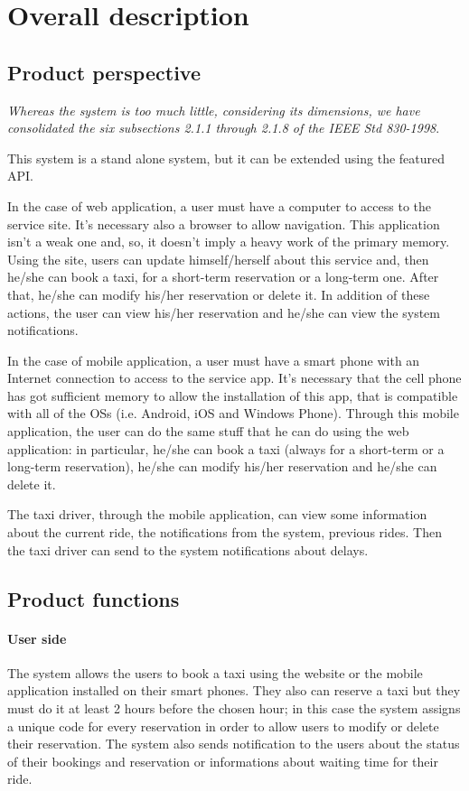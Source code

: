 \section{Overall description}
	\subsection{Product perspective}
		\emph{Whereas the system is too much little, considering its dimensions, we have consolidated the six subsections 2.1.1 through 2.1.8 of the IEEE Std 830-1998}.
		\vspace{10pt}
		
		This system is a stand alone system, but it can be extended using the featured API.
		
		In the case of web application, a user must have a computer to access to the service site. It's necessary also a browser to allow navigation. This application isn't a weak one and, so, it doesn't imply a heavy work of the primary memory. 
		Using the site, users can update himself/herself about this service and, then he/she can book a taxi, for a short-term reservation or a long-term one. After that, he/she can modify his/her reservation or delete it. In addition of these actions, the user can view his/her reservation and he/she can view the system notifications.
		
		In the case of mobile application, a user must have a smart phone with an Internet connection to access to the service app. It's necessary that the cell phone has got sufficient memory to allow the installation of this app, that is compatible with all of the OSs (i.e. Android, iOS and Windows Phone).
		Through this mobile application, the user can do the same stuff that he can do using the web application: in particular, he/she can book a taxi (always for a short-term or a long-term reservation), he/she can modify his/her reservation and he/she can delete it.
		
		The taxi driver, through the mobile application, can view some information about the current ride, the notifications from the system, previous rides. Then the taxi driver can send to the system notifications about delays.  
	\subsection{Product functions}
		\paragraph{User side}The system allows the users to book a taxi using the website or the mobile application installed on their smart phones. They also can reserve a taxi but they must do it at least 2 hours before the chosen hour; in this case the system assigns a unique code for every reservation in order to allow users to modify or delete their reservation. The system also sends notification to the users about the status of their bookings and reservation or informations about waiting time for their ride.
